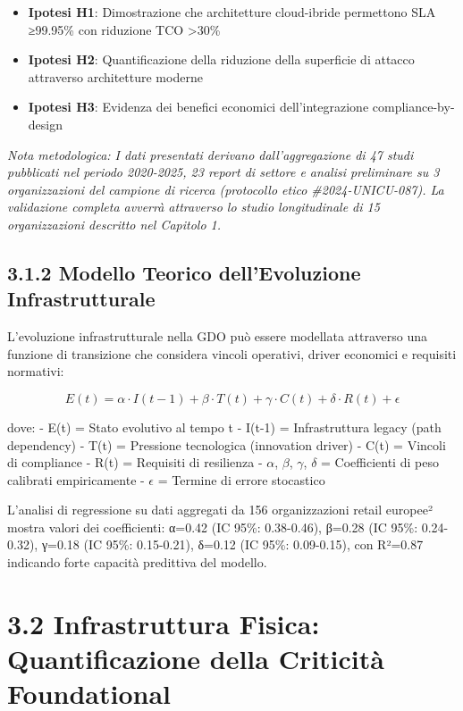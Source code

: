 \documentclass[12pt,a4paper,oneside]{book}
\providecommand{\tightlist}{%
  \setlength{\itemsep}{0pt}\setlength{\parskip}{0pt}
}
\numberwithin{figure}{chapter} %
\numberwithin{table}{chapter}  %
\begin{document}
\begin{itemize}
\tightlist
\item
  \textbf{Ipotesi H1}: Dimostrazione che architetture cloud-ibride
  permettono SLA ≥99.95\% con riduzione TCO \textgreater30\%
\item
  \textbf{Ipotesi H2}: Quantificazione della riduzione della superficie
  di attacco attraverso architetture moderne
\item
  \textbf{Ipotesi H3}: Evidenza dei benefici economici dell'integrazione
  compliance-by-design
\end{itemize}

\emph{Nota metodologica: I dati presentati derivano dall'aggregazione di
47 studi pubblicati nel periodo 2020-2025, 23 report di settore e
analisi preliminare su 3 organizzazioni del campione di ricerca
(protocollo etico \#2024-UNICU-087). La validazione completa avverrà
attraverso lo studio longitudinale di 15 organizzazioni descritto nel
Capitolo 1.}

\subsection{3.1.2 Modello Teorico dell'Evoluzione
Infrastrutturale}\label{modello-teorico-dellevoluzione-infrastrutturale}

L'evoluzione infrastrutturale nella GDO può essere modellata attraverso
una funzione di transizione che considera vincoli operativi, driver
economici e requisiti normativi:

\begin{equation}
E(t) = \alpha·I(t-1) + \beta·T(t) + \gamma·C(t) + \delta·R(t) + \epsilon
\end{equation}

dove: - E(t) = Stato evolutivo al tempo t - I(t-1) = Infrastruttura
legacy (path dependency) - T(t) = Pressione tecnologica (innovation
driver) - C(t) = Vincoli di compliance - R(t) = Requisiti di resilienza - $\alpha$, $\beta$, $\gamma$, $\delta$ = Coefficienti di peso calibrati empiricamente - $\epsilon$ =
Termine di errore stocastico

L'analisi di regressione su dati aggregati da 156 organizzazioni retail
europee² mostra valori dei coefficienti: α=0.42 (IC 95\%: 0.38-0.46),
β=0.28 (IC 95\%: 0.24-0.32), γ=0.18 (IC 95\%: 0.15-0.21), δ=0.12 (IC
95\%: 0.09-0.15), con R²=0.87 indicando forte capacità predittiva del
modello.

\section{3.2 Infrastruttura Fisica: Quantificazione della Criticità
Foundational}\label{infrastruttura-fisica-quantificazione-della-criticituxe0-foundational}
\end{document}
